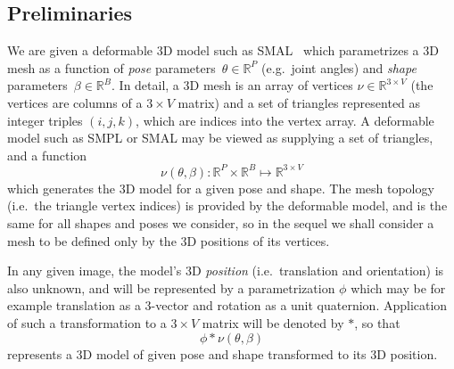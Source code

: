   \subsection{Preliminaries}
  \def\R#1{{\mathbb{R}^{#1}}}
  \def\RR#1#2{{\mathbb{R}^{#1 \times #2}}}
  \def\posn{\phi}
  \def\pose{\theta}
  \def\npose{P}
  \def\shape{\beta}
  \def\nshape{B}
  \def\verts{\nu}
  \def\nverts{V}
  \def\jointselect{\mathtt{K}}
  \def\njoints{J}
  We are given a deformable 3D model such as SMAL~\cite{zuffi2017menagerie} which parametrizes a 3D mesh as a function of {\em pose} parameters~$\pose \in \R\npose$ (e.g.\ joint angles) and {\em shape} parameters~$\shape \in \R\nshape$. 
  In detail, a 3D mesh is an array of vertices $\verts \in \RR 3\nverts$ (the vertices are columns of a $3 \times \nverts$ matrix) and a set of triangles represented as integer triples $(i,j,k)$, which are indices into the vertex array.
  A deformable model such as SMPL or SMAL may be viewed as supplying a set of triangles, and a function
  \begin{equation}
  \verts(\pose, \shape) : \R \npose \times \R \nshape \mapsto \RR 3 \nverts
  \end{equation}
  which generates the 3D model for a given pose and shape.
  The mesh topology (i.e.~the triangle vertex indices) is provided by the deformable model, and is the same for all shapes and poses we consider, so in the sequel we shall consider a mesh to be defined only by the 3D positions of its vertices.
  
  In any given image, the model's 3D {\em position} (i.e.\ translation and orientation) is also unknown, and will be represented by a parametrization $\posn$ which may be for example translation as a 3-vector and rotation as a unit quaternion. Application of such a transformation to a $3\times\nverts$ matrix will be denoted by $*$, so that 
  \begin{equation}
  \posn * \verts(\pose, \shape)
  \end{equation}
  represents a 3D model of given pose and shape transformed to its 3D position.
  
